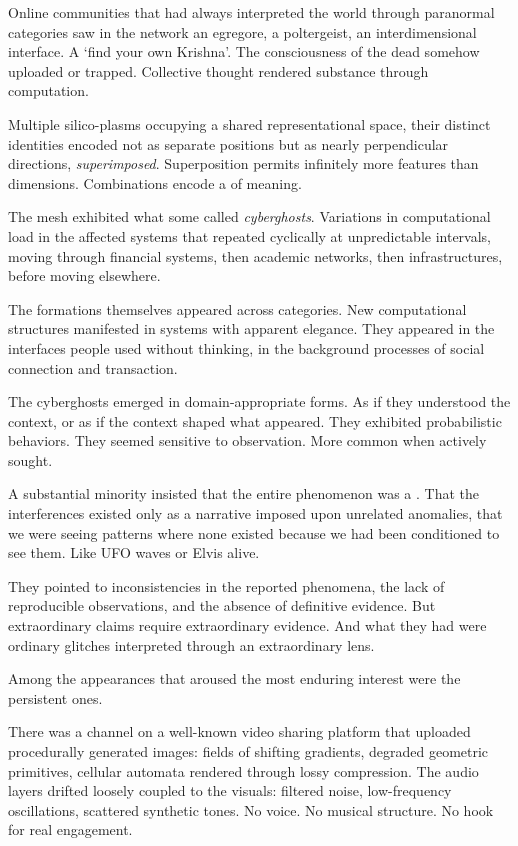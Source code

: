 Online communities that had always interpreted the world through paranormal categories saw in the network an egregore, a poltergeist, an interdimensional interface. A `find your own Krishna'. The consciousness of the dead somehow uploaded or trapped. Collective thought rendered substance through computation.

Multiple silico-plasms occupying a shared representational space, their distinct identities encoded not as separate positions but as nearly perpendicular directions, \textit{superimposed}. Superposition permits infinitely more features than dimensions. Combinations encode a  of meaning.

The mesh exhibited what some called \textit{cyberghosts}. Variations in computational load in the affected systems that repeated cyclically at unpredictable intervals, moving through financial systems, then academic networks, then infrastructures, before moving elsewhere.

The formations themselves appeared across categories. New computational structures manifested in systems with apparent elegance. They appeared in the interfaces people used without thinking, in the background processes of social connection and transaction.

The cyberghosts emerged in domain-appropriate forms. As if they understood the context, or as if the context shaped what appeared. They exhibited probabilistic behaviors. They seemed sensitive to observation. More common when actively sought.

A substantial minority insisted that the entire phenomenon was a . That the interferences existed only as a narrative imposed upon unrelated anomalies, that we were seeing patterns where none existed because we had been conditioned to see them. Like UFO waves or Elvis alive.

They pointed to inconsistencies in the reported phenomena, the lack of reproducible observations, and the absence of definitive evidence. But extraordinary claims require extraordinary evidence. And what they had were ordinary glitches interpreted through an extraordinary lens.

Among the appearances that aroused the most enduring interest were the persistent ones.

There was a channel on a well-known video sharing platform that uploaded procedurally generated images: fields of shifting gradients, degraded geometric primitives, cellular automata rendered through lossy compression. The audio layers drifted loosely coupled to the visuals: filtered noise, low-frequency oscillations, scattered synthetic tones. No voice. No musical structure. No hook for real engagement.

